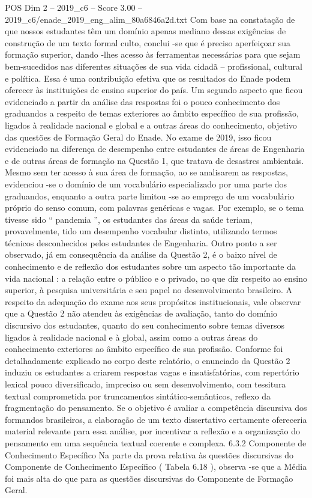 \begin{textsample}{POS Dim 2 – 2019\_c6 – Score 3.00 – 2019\_c6/enade\_2019\_eng\_alim\_80a6846a2d.txt}
Com base na constatação de que nossos estudantes têm um domínio apenas mediano dessas exigências de construção de um texto formal culto, conclui -se que é preciso aperfeiçoar sua formação superior, dando -lhes acesso às ferramentas necessárias para que sejam bem-sucedidos nas diferentes situações de sua vida cidadã – profissional, cultural e política.
Essa é uma contribuição efetiva que os resultados do Enade podem oferecer às instituições de ensino superior do país.
Um segundo aspecto que ficou evidenciado a partir da análise das respostas foi o pouco conhecimento dos graduandos a respeito de temas exteriores ao âmbito específico de sua profissão, ligados à realidade nacional e global e a outras áreas do conhecimento, objetivo das questões de Formação Geral do Enade.
No exame de 2019, isso ficou evidenciado na diferença de desempenho entre estudantes de áreas de Engenharia e de outras áreas de formação na Questão 1, que tratava de desastres ambientais.
Mesmo sem ter acesso à sua área de formação, ao se analisarem as respostas, evidenciou -se o domínio de um vocabulário especializado por uma parte dos graduandos, enquanto a outra parte limitou -se ao emprego de um vocabulário próprio do senso comum, com palavras genéricas e vagas.
Por exemplo, se o tema tivesse sido “ pandemia ”, os estudantes das áreas da saúde teriam, provavelmente, tido um desempenho vocabular distinto, utilizando termos técnicos desconhecidos pelos estudantes de Engenharia.
Outro ponto a ser observado, já em consequência da análise da Questão 2, é o baixo nível de conhecimento e de reflexão dos estudantes sobre um aspecto tão importante da vida nacional : a relação entre o público e o privado, no que diz respeito ao ensino superior, à pesquisa universitária e seu papel no desenvolvimento brasileiro.
A respeito da adequação do exame aos seus propósitos institucionais, vale observar que a Questão 2 não atendeu às exigências de avaliação, tanto do domínio discursivo dos estudantes, quanto do seu conhecimento sobre temas diversos ligados à realidade nacional e à global, assim como a outras áreas do conhecimento exteriores ao âmbito específico de sua profissão.
Conforme foi detalhadamente explicado no corpo deste relatório, o enunciado da Questão 2 induziu os estudantes a criarem respostas vagas e insatisfatórias, com repertório lexical pouco diversificado, impreciso ou sem desenvolvimento, com tessitura textual comprometida por truncamentos sintático-semânticos, reflexo da fragmentação do pensamento.
Se o objetivo é avaliar a competência discursiva dos formandos brasileiros, a elaboração de um texto dissertativo certamente ofereceria material relevante para essa análise, por incentivar a reflexão e a organização do pensamento em uma sequência textual coerente e complexa. 6.3.2 Componente de Conhecimento Específico Na parte da prova relativa às questões discursivas do Componente de Conhecimento Específico ( Tabela 6.18 ), observa -se que a Média foi mais alta do que para as questões discursivas do Componente de Formação Geral.

\end{textsample}
